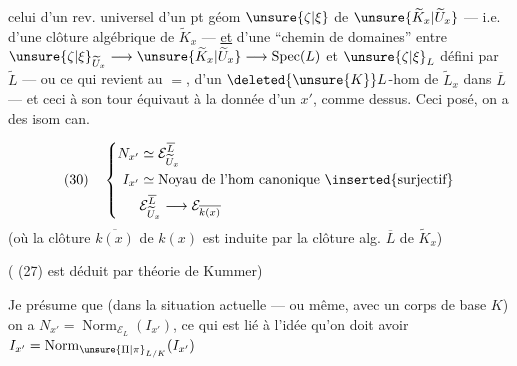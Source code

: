 
celui d'un rev. universel   d'un pt géom $\unsure{\zeta|\xi}$ de $\unsure{\widetilde K_x|\widetilde U_x}$ --- i.e. d'une clôture algébrique de $\widetilde K_x$ --- \uline{et} d'une  ``chemin de domaines'' entre $\unsure{\zeta|\xi}_{\widetilde U_x}\longrightarrow\unsure{\widetilde K_x|\widetilde U_x}\longrightarrow\operatorname{Spec}(L)$ et $\unsure{\zeta|\xi}_L$ défini par $\widetilde L$ --- ou ce qui revient au $=$,  d'un $\deleted{\unsure{K}}L$-hom de   $\widetilde L_x$ dans $\overline L$ --- et ceci à son tour équivaut à la donnée d'un $x'$,  comme dessus. Ceci posé, on a des isom can.

\[
(30)\quad\left\{\begin{aligned}
N_{x'}&\simeq\mathcal E_{\widetilde U_x}^{\overline L}\\
I_{x'}&\simeq\text{Noyau de l'hom canonique }\inserted{\text{surjectif}}\\
&\mathcal E_{\widetilde U_x}^{\overline L}\longrightarrow\mathcal E_{\overline{k(x)}}
\end{aligned}\right.
\]
(où la clôture  $\overline{k(x)}$ de $k(x)$ est induite par la clôture alg. $\overline L$ de $\widetilde K_x$)


( (27) est déduit par théorie de Kummer)\unsure{,}



Je présume que (dans la situation actuelle --- ou même, avec un corps de base $K$) on a $N_{x'}=\operatorname{Norm}_{\mathcal E_L}(I_{x'})$,  ce qui est lié à l'idée qu'on doit avoir $I_{x'}=\operatorname{Norm}_{\unsure{\Pi|\pi}_{L/K}}(I_{x'})$

